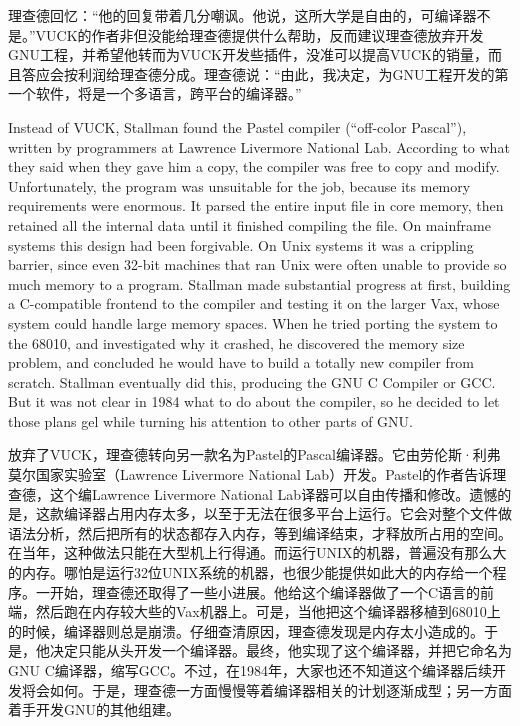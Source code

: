 \ifdefined\chs
理查德回忆：“他的回复带着几分嘲讽。他说，这所大学是自由的，可编译器不是。”VUCK的作者非但没能给理查德提供什么帮助，反而建议理查德放弃开发GNU工程，并希望他转而为VUCK开发些插件，没准可以提高VUCK的销量，而且答应会按利润给理查德分成。理查德说：“由此，我决定，为GNU工程开发的第一个软件，将是一个多语言，跨平台的编译器。”
\fi

\ifdefined\eng
Instead of VUCK, Stallman found the Pastel compiler (``off-color Pascal''), written by programmers at Lawrence Livermore National Lab. According to what they said when they gave him a copy, the compiler was free to copy and modify. Unfortunately, the program was unsuitable for the job, because its memory requirements were enormous.  It parsed the entire input file in core memory, then retained all the internal data until it finished compiling the file. On mainframe systems this design had been forgivable. On Unix systems it was a crippling barrier, since even 32-bit machines that ran Unix were often unable to provide so much memory to a program. Stallman made substantial progress at first, building a C-compatible frontend to the compiler and testing it on the larger Vax, whose system could handle large memory spaces. When he tried porting the system to the 68010, and investigated why it crashed,  he discovered the memory size problem, and concluded he would have to build a totally new compiler from scratch.  Stallman eventually did this, producing the GNU C Compiler or GCC.  But it was not clear in 1984 what to do about the compiler, so he decided to let those plans gel while turning his attention to other parts of GNU.
\fi

\ifdefined\chs
放弃了VUCK，理查德转向另一款名为Pastel的Pascal编译器。它由劳伦斯·利弗莫尔国家实验室（Lawrence Livermore National Lab）开发。Pastel的作者告诉理查德，这个编Lawrence Livermore National Lab译器可以自由传播和修改。遗憾的是，这款编译器占用内存太多，以至于无法在很多平台上运行。它会对整个文件做语法分析，然后把所有的状态都存入内存，等到编译结束，才释放所占用的空间。在当年，这种做法只能在大型机上行得通。而运行UNIX的机器，普遍没有那么大的内存。哪怕是运行32位UNIX系统的机器，也很少能提供如此大的内存给一个程序。一开始，理查德还取得了一些小进展。他给这个编译器做了一个C语言的前端，然后跑在内存较大些的Vax机器上。可是，当他把这个编译器移植到68010上的时候，编译器则总是崩溃。仔细查清原因，理查德发现是内存太小造成的。于是，他决定只能从头开发一个编译器。最终，他实现了这个编译器，并把它命名为GNU C编译器，缩写GCC。不过，在1984年，大家也还不知道这个编译器后续开发将会如何。于是，理查德一方面慢慢等着编译器相关的计划逐渐成型；另一方面着手开发GNU的其他组建。
\fi

